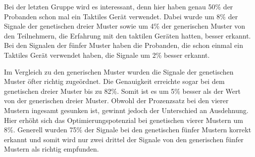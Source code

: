 Bei der letzten Gruppe wird es interessant, denn hier haben genau 50\% der Probanden schon mal ein Taktiles Gerät verwendet. 
Dabei wurde um 8\% der Signale der genetischen dreier Muster sowie um 4\% der generischen Muster von den Teilnehmern, die Erfahrung mit den taktilen Geräten hatten, besser erkannt.
Bei den Signalen der fünfer Muster haben die Probanden, die schon einmal ein Taktiles Gerät verwendet haben, die Signale um 2\% besser erkannt.

Im Vergleich zu den generischen Muster wurden die Signale der genetischen Muster öfter richtig zugeördnet. 
Die Genauigkeit erreichte sogar bei dem genetischen dreier Muster bis zu 82\%. 
Somit ist es um 5\% besser als der Wert von der generischen dreier Muster.
Obwohl der Prozenzsatz bei den vierer Mustern ingesamt gesunken ist, gewinnt jedoch der Unterschied an Ausdehnung.
Hier erhöht sich das Optimierungspotenzial bei genetischen vierer Mustern um 8\%.
Generell wurden 75\% der Signale bei den genetischen fünfer Mustern korrekt erkannt und somit wird nur zwei drittel der Signale von den generischen fünfer Mustern als richtig empfunden.



